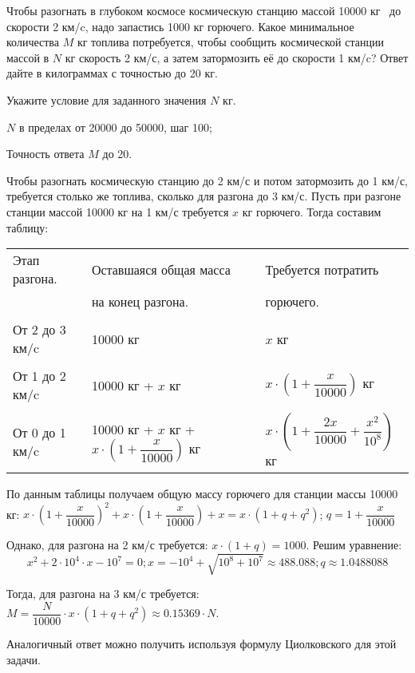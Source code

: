
Чтобы разогнать в глубоком космосе
космическую станцию массой 10000 кг  до скорости
2 км/c, надо запастись 1000 кг горючего. Какое минимальное количества \linebreak $M$ кг топлива потребуется,
чтобы сообщить космической станции массой в $N$ кг скорость 2 км/с, 
а затем затормозить её до скорости 1 км/c? Ответ дайте в килограммах с точностью до 20 кг.

Укажите условие для заданного значения $N$ кг.

\paramSection

$N$ в пределах от 20000 до 50000, шаг 100;         

Точность ответа $M$  до  20.
\solutionSection

Чтобы разогнать космическую станцию до 2 км/с и потом затормозить до 1 км/с, требуется столько же топлива, 
сколько для разгона до 3 км/с. Пусть при разгоне станции массой 10000 кг  на 1 км/с требуется $x$ кг горючего. 
Тогда составим таблицу:
\begin{tabular}{l l l}
    Этап разгона. &	Оставшаяся общая масса  &	Требуется потратить \\
    & на конец разгона. & горючего.\\
    & & \\
    От 2 до 3 км/c & 	10000 кг  &  	$x$ кг\\
    & & \\
    От  1 до 2 км/c & 	10000 кг  + $x$ кг	 & $x \cdot \left( 1 + \dfrac{x}{10000}\right)$  кг\\
    & & \\
    От 0 до 1 км/c & 	10000 кг  + $x$ кг + $x \cdot \left( 1 + \dfrac{x}{10000}\right)$  кг	 & $x \cdot \left( 1 + \dfrac{2x}{10000} + \dfrac{x^2}{10^8}\right)$   кг\\
\end{tabular}

По данным таблицы получаем общую массу горючего для станции \linebreak массы 10000 кг:
$x \cdot \left( 1 + \dfrac{x}{10000}\right)^2+x \cdot \left( 1 +\dfrac{x}{10000}\right)+x=x  \cdot (1+q+q^2 )$;  
$q=1 +\dfrac{x}{10000}$ 

Однако, для разгона на 2 км/с требуется: $x  \cdot (1+q)=1000 $. Решим уравнение:
$$x^2+2 \cdot 10^4 \cdot x-10^7=0; x= -10^4+\sqrt{10^8+10^7}  \approx 488.088; q\approx 1.0488088 $$

Тогда, для разгона на 3 км/с требуется: $M=\dfrac{N}{10000} \cdot x \cdot (1+q+q^2 )\approx 0.15369 \cdot N.$

Аналогичный ответ можно получить используя формулу Циолковского для этой задачи.

